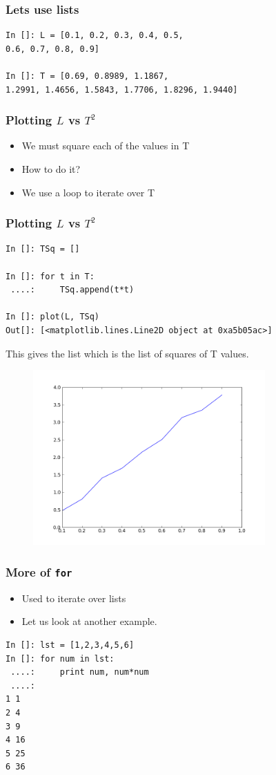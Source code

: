 \documentclass[14pt,compress]{beamer}
\newcommand{\kwrd}[1]{ \texttt{\textbf{\color{blue}{#1}}}  }
\begin{document}
\begin{frame}[fragile]
\frametitle{Lets use lists}
\begin{lstlisting}
In []: L = [0.1, 0.2, 0.3, 0.4, 0.5, 
0.6, 0.7, 0.8, 0.9]

In []: T = [0.69, 0.8989, 1.1867, 
1.2991, 1.4656, 1.5843, 1.7706, 1.8296, 1.9440]
\end{lstlisting}
\end{frame}

\begin{frame}[fragile]
\frametitle{Plotting $L$ vs $T^2$}
\begin{itemize}
\item We must square each of the values in T
\item How to do it?
\item We use a \kwrd{for} loop to iterate over T
\end{itemize}
\end{frame}

\begin{frame}[fragile]
\frametitle{Plotting $L$ vs $T^2$}
\begin{lstlisting}
In []: TSq = []

In []: for t in T:
 ....:     TSq.append(t*t)

In []: plot(L, TSq)
Out[]: [<matplotlib.lines.Line2D object at 0xa5b05ac>]
\end{lstlisting}
This gives the list \kwrd{TSq} which is the list of squares of T values.
\end{frame}

\begin{frame}[fragile]
\begin{figure}
\includegraphics[width=3.5in]{data/L-TSq-limited.png}
\end{figure}
\end{frame}

\begin{frame}[fragile]
\frametitle{More of \texttt{for}}
\begin{itemize}
\item Used to iterate over lists
\item Let us look at another example.
\end{itemize}
\begin{lstlisting}
In []: lst = [1,2,3,4,5,6]
In []: for num in lst:
 ....:     print num, num*num
 ....:    
1 1
2 4
3 9
4 16
5 25
6 36
\end{lstlisting}
\end{frame}
\end{document}
